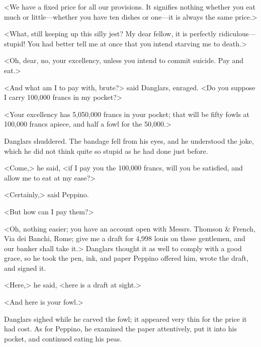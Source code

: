  <We have a fixed price for all our provisions. It signifies nothing whether you eat much or little—whether you have ten dishes or one—it is always the same price.> 

 <What, still keeping up this silly jest? My dear fellow, it is perfectly ridiculous—stupid! You had better tell me at once that you intend starving me to death.> 

 <Oh, dear, no, your excellency, unless you intend to commit suicide. Pay and eat.> 

 <And what am I to pay with, brute?> said Danglars, enraged. <Do you suppose I carry 100,000 francs in my pocket?> 

 <Your excellency has 5,050,000 francs in your pocket; that will be fifty fowls at 100,000 francs apiece, and half a fowl for the 50,000.> 

 Danglars shuddered. The bandage fell from his eyes, and he understood the joke, which he did not think quite so stupid as he had done just before. 

 <Come,> he said, <if I pay you the 100,000 francs, will you be satisfied, and allow me to eat at my ease?> 

 <Certainly,> said Peppino. 

 <But how can I pay them?> 

 <Oh, nothing easier; you have an account open with Messrs. Thomson \& French, Via dei Banchi, Rome; give me a draft for 4,998 louis on these gentlemen, and our banker shall take it.>  Danglars thought it as well to comply with a good grace, so he took the pen, ink, and paper Peppino offered him, wrote the draft, and signed it. 

 <Here,> he said, <here is a draft at sight.> 

 <And here is your fowl.> 

 Danglars sighed while he carved the fowl; it appeared very thin for the price it had cost. As for Peppino, he examined the paper attentively, put it into his pocket, and continued eating his peas. 